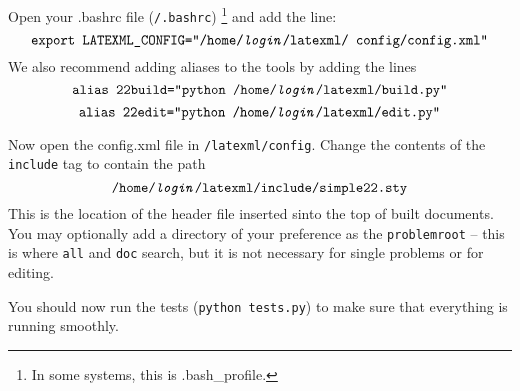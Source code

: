     Open your .bashrc file (\texttt{\mytilde/.bashrc})
    \footnote{In some systems, this is .bash\_profile.} 
    and add the line: 
    \[\texttt{export LATEXML\_CONFIG=\ttquote /home/\textit{login}/latexml/
    config/config.xml\ttquote}\] We also recommend adding aliases to the 
    tools by adding the lines 
    \[\texttt{alias 22build=\ttquote python /home/\textit{login}/latexml/build.py\ttquote}\]
    \[\texttt{alias 22edit=\ttquote python /home/\textit{login}/latexml/edit.py\ttquote}\]
    
    Now open the config.xml file in \texttt{\mytilde/latexml/config}. 
    Change the contents of the \texttt{include} tag to contain the path 
    \[\texttt{/home/\textit{login}/latexml/include/simple22.sty}\] 
    This is the location of 
    the header file inserted sinto the top of built documents. You may optionally
    add a directory of your preference as the \texttt{problemroot} -- this
    is where \texttt{\pybuild all} and \texttt{\pybuild doc} search, but
    it is not necessary for single problems or for editing.
    
    You should now run the tests (\texttt{python tests.py}) to make sure that 
    everything is running smoothly.
    